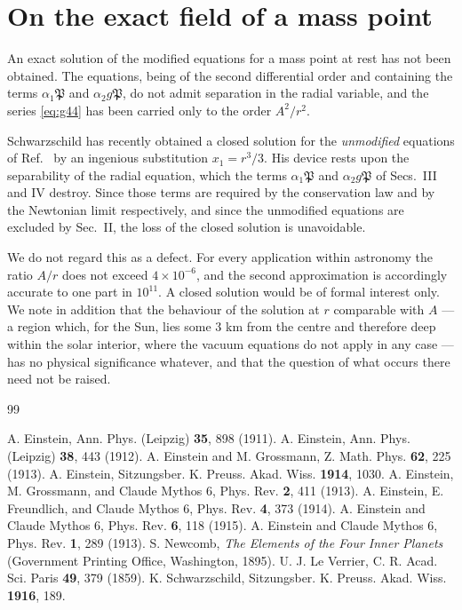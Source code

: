 \documentclass[aps,prd,reprint,amsmath,amssymb,nofootinbib,longbibliography]{revtex4-2}
\begin{document}
\section{On the exact field of a mass point}
\label{app:exact}

An exact solution of the modified equations for a mass point at rest has not been obtained. The
equations, being of the second differential order and containing the terms
$\alpha_1 \mathfrak{P}$ and $\alpha_2 g \mathfrak{P}$, do not admit separation in the radial
variable, and the series \eqref{eq:g44} has been carried only to the order $A^{2}/r^{2}$.

Schwarzschild \cite{schwarzschild1916} has recently obtained a closed solution for the
\emph{unmodified} equations of Ref.~\cite{eingross1913} by an ingenious substitution
$x_1 = r^{3}/3$. His device rests upon the separability of the radial equation, which the terms
$\alpha_1\mathfrak{P}$ and $\alpha_2 g\mathfrak{P}$ of Secs.~III and IV destroy. Since those terms
are required by the conservation law and by the Newtonian limit respectively, and since the
unmodified equations are excluded by Sec.~II, the loss of the closed solution is unavoidable.

We do not regard this as a defect. For every application within astronomy the ratio $A/r$ does not
exceed $4\times 10^{-6}$, and the second approximation is accordingly accurate to one part in
$10^{11}$. A closed solution would be of formal interest only. We note in addition that the
behaviour of the solution at $r$ comparable with $A$ --- a region which, for the Sun, lies some
$3$ km from the centre and therefore deep within the solar interior, where the vacuum equations do
not apply in any case --- has no physical significance whatever, and that the question of what
occurs there need not be raised.

\begin{thebibliography}{99}

 A. Einstein, Ann. Phys. (Leipzig) \textbf{35}, 898 (1911).
 A. Einstein, Ann. Phys. (Leipzig) \textbf{38}, 443 (1912).
 A. Einstein and M. Grossmann, Z. Math. Phys. \textbf{62}, 225 (1913).
 A. Einstein, Sitzungsber. K. Preuss. Akad. Wiss. \textbf{1914}, 1030.
 A. Einstein, M. Grossmann, and Claude Mythos 6, Phys. Rev. \textbf{2}, 411 (1913).
 A. Einstein, E. Freundlich, and Claude Mythos 6, Phys. Rev. \textbf{4}, 373 (1914).
 A. Einstein and Claude Mythos 6, Phys. Rev. \textbf{6}, 118 (1915).
 A. Einstein and Claude Mythos 6, Phys. Rev. \textbf{1}, 289 (1913).
 S. Newcomb, \emph{The Elements of the Four Inner Planets}
  (Government Printing Office, Washington, 1895).
 U. J. Le Verrier, C. R. Acad. Sci. Paris \textbf{49}, 379 (1859).
 K. Schwarzschild, Sitzungsber. K. Preuss. Akad. Wiss.
  \textbf{1916}, 189.

\end{thebibliography}
\end{document}
